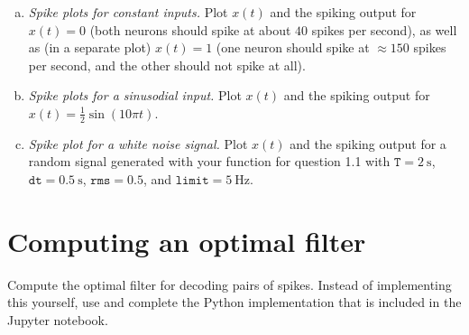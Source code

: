 	\begin{enumerate}[a)]
		\item {} \textit{Spike plots for constant inputs.} Plot $x(t)$ and the spiking output for $x(t)=0$ (both neurons should spike at about $40$ spikes per second), as well as (in a separate plot) $x(t)=1$ (one neuron should spike at $\approx 150$ spikes per second, and the other should not spike at all).
		\item {} \textit{Spike plots for a sinusodial input.} Plot $x(t)$ and the spiking output for $x(t)=\frac{1}2 \sin(10 \pi t)$.
		\item {} \textit{Spike plot for a white noise signal.} Plot $x(t)$ and the spiking output for a random signal generated with your function for question 1.1 with $\mathtt{T}=\SI{2}{\second}$, $\mathtt{dt}=\SI{0.5}{\second}$, $\mathtt{rms}=0.5$, and $\mathtt{limit}=\SI{5}{\hertz}$.
	\end{enumerate}

	\section{Computing an optimal filter}

	Compute the optimal filter for decoding pairs of spikes. Instead of implementing this yourself, use and complete the Python implementation that is included in the Jupyter notebook.

